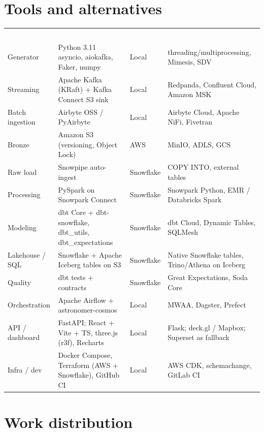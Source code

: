 \documentclass[10pt,a4paper]{article}
\newcommand{\thead}[1]{\textcolor{white}{\bfseries #1}}
\begin{document}
\section{Tools and alternatives}

{\footnotesize
{}
\begin{tabularx}{\linewidth}{@{}>{\raggedright\arraybackslash}p{2.4cm}>{\raggedright\arraybackslash}p{6.4cm}>{\raggedright\arraybackslash}p{1.6cm}Y@{}}
\thead{Layer} & \thead{Chosen} & \thead{Runs} & \thead{Alternatives} \\
Generator & Python 3.11 asyncio, aiokafka, Faker, numpy & Local & threading/multiprocessing, Mimesis, SDV \\
Streaming & Apache Kafka (KRaft) + Kafka Connect S3 sink & Local & Redpanda, Confluent Cloud, Amazon MSK \\
Batch ingestion & Airbyte OSS / PyAirbyte & Local & Airbyte Cloud, Apache NiFi, Fivetran \\
Bronze & Amazon S3 (versioning, Object Lock) & AWS & MinIO, ADLS, GCS \\
Raw load & Snowpipe auto-ingest & Snowflake & COPY INTO, external tables \\
Processing & PySpark on Snowpark Connect & Snowflake & Snowpark Python, EMR / Databricks Spark \\
Modeling & dbt Core + dbt-snowflake, dbt\_utils, dbt\_expectations & Snowflake & dbt Cloud, Dynamic Tables, SQLMesh \\
Lakehouse / SQL & Snowflake + Apache Iceberg tables on S3 & Snowflake & Native Snowflake tables, Trino/Athena on Iceberg \\
Quality & dbt tests + contracts & Snowflake & Great Expectations, Soda Core \\
Orchestration & Apache Airflow + astronomer-cosmos & Local & MWAA, Dagster, Prefect \\
API / dashboard & FastAPI; React + Vite + TS, three.js (r3f), Recharts & Local & Flask; deck.gl / Mapbox; Superset as fallback \\
Infra / dev & Docker Compose, Terraform (AWS + Snowflake), GitHub CI & Local & AWS CDK, schemachange, GitLab CI \\
\end{tabularx}}

\section{Work distribution}
\end{document}
